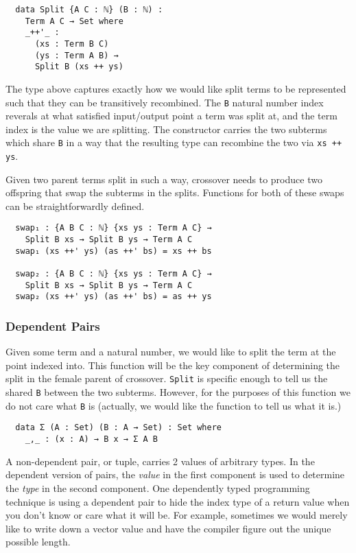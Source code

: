 \documentclass{acm_proc_article-sp}
\begin{document}
\begin{verbatim}
  data Split {A C : ℕ} (B : ℕ) :
    Term A C → Set where
    _++'_ :
      (xs : Term B C)
      (ys : Term A B) →
      Split B (xs ++ ys)
\end{verbatim}

The type above captures exactly how we would like split terms to be
represented such that they can be transitively recombined. The
\texttt{B} natural number index reverals at what satisfied
input/output point a term was split at, and the term index is the
value we are splitting. The constructor carries the two
subterms which share \texttt{B} in a way that the resulting type can
recombine the two via \texttt{xs ++ ys}.

Given two parent terms split in such a way, crossover needs to produce
two offspring that swap the subterms in the splits. Functions for both
of these swaps can be straightforwardly defined.

\begin{verbatim}
  swap₁ : {A B C : ℕ} {xs ys : Term A C} →
    Split B xs → Split B ys → Term A C
  swap₁ (xs ++' ys) (as ++' bs) = xs ++ bs

  swap₂ : {A B C : ℕ} {xs ys : Term A C} →
    Split B xs → Split B ys → Term A C
  swap₂ (xs ++' ys) (as ++' bs) = as ++ ys
\end{verbatim}

\subsubsection{Dependent Pairs}

Given some term and a natural number, we would like to split the term
at the point indexed into. This function will be the key component of
determining the split in the female parent of
crossover. \texttt{Split} is specific enough to tell us the shared
\texttt{B} between the two subterms. However, for the purposes of this
function we do not care what \texttt{B} is (actually, we would like
the function to tell us what it is.)

\begin{verbatim}
  data Σ (A : Set) (B : A → Set) : Set where
    _,_ : (x : A) → B x → Σ A B
\end{verbatim}

A non-dependent pair, or tuple, carries 2 values of arbitrary
types. In the dependent version of pairs, the \textit{value} in the first
component is used to determine the \textit{type} in the second
component. One dependently typed programming technique is using a
dependent pair to hide the index type of a return value when you don't
know or care what it will be. For example, sometimes we would merely
like to write down a vector value and have the compiler figure out the
unique possible length.
\end{document}
